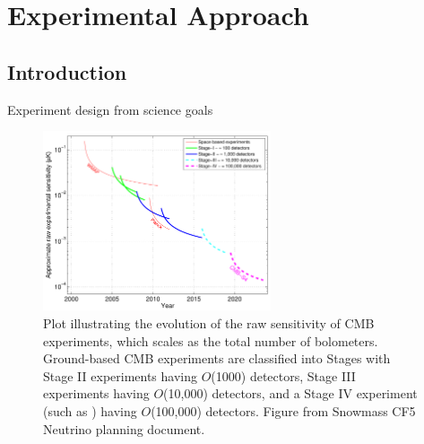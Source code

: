  
\chapter{Experimental Approach}
\renewcommand*\thesection{\arabic{section}}

\def\nnu{N_{\mathrm eff}}
\def\gtrsim{\raise-.75ex\hbox{$\buildrel>\over\sim$}}

\section{Introduction}

Experiment design from science goals

\begin{figure}[!h]
\centering \includegraphics[width=0.6\textwidth]{Intro/expt_progress.pdf}
\caption{Plot illustrating the evolution of the raw sensitivity of CMB
  experiments, which scales as the total number of
  bolometers. Ground-based CMB experiments are classified into Stages
  with Stage II experiments having $O$(1000) detectors, Stage III
  experiments having $O$(10,000) detectors, and a Stage IV experiment
  (such as \cmbexp) having $O$(100,000) detectors. Figure from Snowmass  CF5
  Neutrino planning document.}
\label{fig:expt_progress}
\end{figure}

